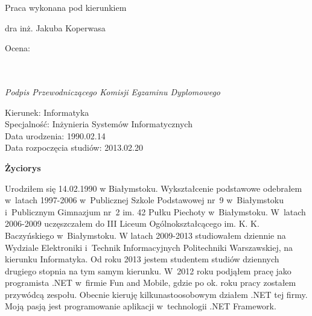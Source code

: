 \begin{titlepage}
 \vspace{3cm}
 
 \hfill Praca wykonana pod kierunkiem
 
 \hfill dra inż. Jakuba Koperwasa
 
 \vspace{3cm}

 \begin{flushleft}
  \begin{minipage}{7cm}
   Ocena: \dotfill \\ \\
   \hspace*{0cm} \dotfill \\[-0.7cm]
   \begin{center}
    \small\textit{Podpis Przewodniczącego Komisji Egzaminu Dyplomowego}
   \end{center}
  \end{minipage}
 \end{flushleft}

\end{titlepage}


\newpage
\thispagestyle{empty}

\begin{flushright}
 Kierunek: Informatyka \\
 Specjalność: Inżynieria Systemów Informatycznych \\
 Data urodzenia: 1990.02.14 \\
 Data rozpoczęcia studiów: 2013.02.20 \\
\end{flushright}

\vspace*{3cm}

\begin{center}
 \textbf{\textbf{Życiorys}}
\end{center}

\vspace{1cm}
 
 Urodziłem się 14.02.1990 w Białymstoku.
 Wykształcenie podstawowe odebrałem w~latach 1997-2006 w~Publicznej Szkole Podstawowej nr~9 w~Białymstoku i~Publicznym Gimnazjum nr~2 im. 42 Pułku Piechoty w~Białymstoku.
 W~latach 2006-2009 uczęszczałem do III Liceum Ogólnokształcącego im. K. K. Baczyńskiego w~Białymstoku.
 W latach 2009-2013 studiowałem dziennie na Wydziale Elektroniki i~Technik Informacyjnych Politechniki Warszawskiej, na kierunku Informatyka.
 Od roku 2013 jestem studentem studiów dziennych drugiego stopnia na tym samym kierunku.
 W~2012 roku podjąłem pracę jako programista .NET w~firmie Fun and Mobile, gdzie po ok. roku pracy zostałem przywódcą zespołu.
 Obecnie kieruję kilkunastoosobowym działem .NET tej firmy.
 Moją pasją jest programowanie aplikacji w~technologii .NET Framework.

